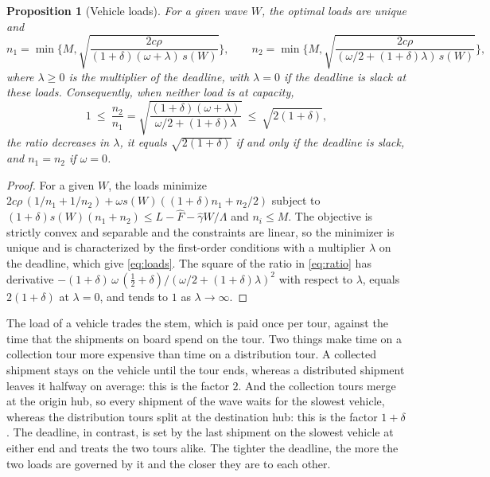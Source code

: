\documentclass[10pt, reqno]{amsart}
\newtheorem{proposition}{Proposition}
\theoremstyle{definition}
\begin{document}
\begin{proposition}[Vehicle loads]\label{prop:loads}
For a given wave $W$, the optimal loads are unique and
\begin{equation}\label{eq:loads}
n_1=\min\Big\{M,\sqrt{\frac{2c\rho}{(1+\delta)(\omega+\lambda)\,s(W)}}\Big\},\qquad
n_2=\min\Big\{M,\sqrt{\frac{2c\rho}{(\omega/2+(1+\delta)\lambda)\,s(W)}}\Big\},
\end{equation}
where $\lambda\ge0$ is the multiplier of the deadline, with $\lambda=0$ if the deadline is slack at these loads. Consequently, when neither load is at capacity,
\begin{equation}\label{eq:ratio}
1\ \le\ \frac{n_2}{n_1}=\sqrt{\frac{(1+\delta)(\omega+\lambda)}{\omega/2+(1+\delta)\lambda}}\ \le\ \sqrt{2(1+\delta)} ,
\end{equation}
the ratio decreases in $\lambda$, it equals $\sqrt{2(1+\delta)}$ if and only if the deadline is slack, and $n_1=n_2$ if $\omega=0$.
\end{proposition}

\begin{proof}
For a given $W$, the loads minimize $2c\rho\,(1/n_1+1/n_2)+\omega s(W)((1+\delta)n_1+n_2/2)$ subject to $(1+\delta)s(W)(n_1+n_2)\le L-\hat F-\hat\gamma W/\Lambda$ and $n_i\le M$. The objective is strictly convex and separable and the constraints are linear, so the minimizer is unique and is characterized by the first-order conditions with a multiplier $\lambda$ on the deadline, which give \eqref{eq:loads}. The square of the ratio in \eqref{eq:ratio} has derivative $-(1+\delta)\,\omega\,(\tfrac12+\delta)/(\omega/2+(1+\delta)\lambda)^2$ with respect to $\lambda$, equals $2(1+\delta)$ at $\lambda=0$, and tends to $1$ as $\lambda\to\infty$.
\end{proof}

The load of a vehicle trades the stem, which is paid once per tour, against the time that the shipments on board spend on the tour. Two things make time on a collection tour more expensive than time on a distribution tour. A collected shipment stays on the vehicle until the tour ends, whereas a distributed shipment leaves it halfway on average: this is the factor $2$. And the collection tours merge at the origin hub, so every shipment of the wave waits for the slowest vehicle, whereas the distribution tours split at the destination hub: this is the factor $1+\delta$. The deadline, in contrast, is set by the last shipment on the slowest vehicle at either end and treats the two tours alike. The tighter the deadline, the more the two loads are governed by it and the closer they are to each other.
\end{document}

